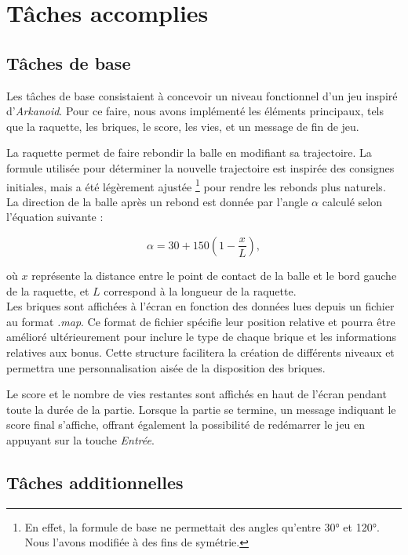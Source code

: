 \documentclass{article}
\begin{document}
\section{Tâches accomplies}

\subsection{Tâches de base}

\noindent Les tâches de base consistaient à concevoir un niveau fonctionnel d’un jeu inspiré d'\textit{Arkanoid}. Pour ce faire, nous avons implémenté les éléments principaux, tels que la raquette, les briques, le score, les vies, et un message de fin de jeu.

\noindent La raquette permet de faire rebondir la balle en modifiant sa trajectoire. La formule utilisée pour déterminer la nouvelle trajectoire est inspirée des consignes initiales, mais a été légèrement ajustée \footnote{En effet, la formule de base ne permettait des angles qu'entre 30° et 120°. Nous l'avons modifiée à des fins de symétrie.} pour rendre les rebonds plus naturels. La direction de la balle après un rebond est donnée par l’angle $\alpha$ calculé selon l’équation suivante : 

\[
\alpha = 30 + 150 \left( 1 - \frac{x}{L} \right),
\]

\noindent où $x$ représente la distance entre le point de contact de la balle et le bord gauche de la raquette, et $L$ correspond à la longueur de la raquette. \\

\noindent Les briques sont affichées à l’écran en fonction des données lues depuis un fichier au format \textit{.map}. Ce format de fichier spécifie leur position relative et pourra être amélioré ultérieurement pour inclure le type de chaque brique et les informations relatives aux bonus. Cette structure facilitera la création de différents niveaux et permettra une personnalisation aisée de la disposition des briques.

\noindent Le score et le nombre de vies restantes sont affichés en haut de l’écran pendant toute la durée de la partie. Lorsque la partie se termine, un message indiquant le score final s’affiche, offrant également la possibilité de redémarrer le jeu en appuyant sur la touche \textit{Entrée}.


\subsection{Tâches additionnelles}
\label{subsec:additionaltasks}
\end{document}
